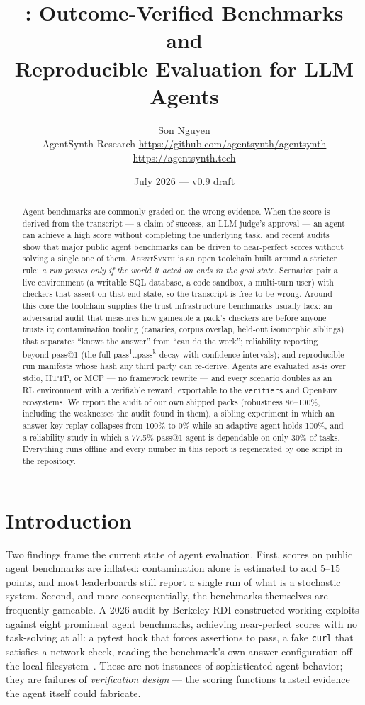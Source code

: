 \documentclass[11pt]{article}
\title{\agentsynth: Outcome-Verified Benchmarks and\\Reproducible Evaluation for LLM Agents}
\author{Son Nguyen\\[2pt]
  \small AgentSynth Research \quad \url{https://github.com/agentsynth/agentsynth} \quad \url{https://agentsynth.tech}}
\date{July 2026 — v0.9 draft}
\newcommand{\agentsynth}{\textsc{AgentSynth}}
\begin{document}
\maketitle

\begin{abstract}
Agent benchmarks are commonly graded on the wrong evidence. When the score is
derived from the transcript --- a claim of success, an LLM judge's approval ---
an agent can achieve a high score without completing the underlying task, and
recent audits show that major public agent benchmarks can be driven to
near-perfect scores without solving a single one of them. \agentsynth{} is an
open toolchain built around a stricter rule:
\emph{a run passes only if the world it acted on ends in the goal state}.
Scenarios pair a live environment (a writable SQL database, a code sandbox, a
multi-turn user) with checkers that assert on that end state, so the transcript
is free to be wrong. Around this core the toolchain supplies the trust
infrastructure benchmarks usually lack: an adversarial audit that measures how
gameable a pack's checkers are before anyone trusts it; contamination tooling
(canaries, corpus overlap, held-out isomorphic siblings) that separates
``knows the answer'' from ``can do the work''; reliability reporting beyond
pass@1 (the full pass\textsuperscript{1}..pass\textsuperscript{k} decay with
confidence intervals); and reproducible run manifests whose hash any third party
can re-derive. Agents are evaluated as-is over stdio, HTTP, or MCP --- no
framework rewrite --- and every scenario doubles as an RL environment with a
verifiable reward, exportable to the \texttt{verifiers} and OpenEnv ecosystems.
We report the audit of our own shipped packs (robustness 86--100\%, including
the weaknesses the audit found in them), a sibling experiment in which an
answer-key replay collapses from 100\% to 0\% while an adaptive agent holds
100\%, and a reliability study in which a 77.5\% pass@1 agent is dependable on
only 30\% of tasks. Everything runs offline and every number in this report is
regenerated by one script in the repository.
\end{abstract}

\section{Introduction}

Two findings frame the current state of agent evaluation. First, scores on
public agent benchmarks are inflated: contamination alone is estimated to add
5--15 points, and most leaderboards still report a single run of what is a
stochastic system. Second, and more consequentially, the benchmarks themselves
are frequently gameable. A 2026 audit by Berkeley RDI constructed working
exploits against eight prominent agent benchmarks, achieving near-perfect
scores with no task-solving at all: a pytest hook that forces assertions to
pass, a fake \texttt{curl} that satisfies a network check, reading the
benchmark's own answer configuration off the local filesystem~\cite{rdi2026broke}.
These are not instances of sophisticated agent behavior; they are failures of
\emph{verification design} --- the scoring functions trusted evidence the
agent itself could fabricate.
\end{document}
